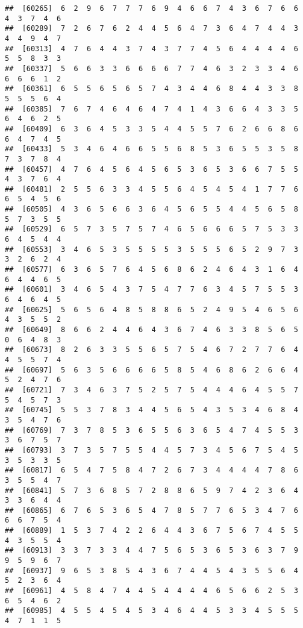 \documentclass[
]{book}
\begin{document}
\begin{verbatim}
##  [60265]  6  2  9  6  7  7  7  6  9  4  6  6  7  4  3  6  7  6  6  4  3  7  4  6
##  [60289]  7  2  6  7  6  2  4  4  5  6  4  7  3  6  4  7  4  4  3  4  4  9  4  7
##  [60313]  4  7  6  4  4  3  7  4  3  7  7  4  5  6  4  4  4  4  6  5  5  8  3  3
##  [60337]  5  6  6  3  3  6  6  6  6  7  7  4  6  3  2  3  3  4  6  6  6  6  1  2
##  [60361]  6  5  5  6  5  6  5  7  4  3  4  4  6  8  4  4  3  3  8  5  5  5  6  4
##  [60385]  7  6  7  4  6  4  6  4  7  4  1  4  3  6  6  4  3  3  5  6  4  6  2  5
##  [60409]  6  3  6  4  5  3  3  5  4  4  5  5  7  6  2  6  6  8  6  6  4  7  4  5
##  [60433]  5  3  4  6  4  6  6  5  5  6  8  5  3  6  5  5  3  5  8  7  3  7  8  4
##  [60457]  4  7  6  4  5  6  4  5  6  5  3  6  5  3  6  6  7  5  5  4  3  7  6  4
##  [60481]  2  5  5  6  3  3  4  5  5  6  4  5  4  5  4  1  7  7  6  6  5  4  5  6
##  [60505]  4  3  6  5  6  6  3  6  4  5  6  5  5  4  4  5  6  5  8  5  7  3  5  5
##  [60529]  6  5  7  3  5  7  5  7  4  6  5  6  6  6  5  7  5  3  3  6  4  5  4  4
##  [60553]  3  4  6  5  3  5  5  5  5  3  5  5  5  6  5  2  9  7  3  3  2  6  2  4
##  [60577]  6  3  6  5  7  6  4  5  6  8  6  2  4  6  4  3  1  6  4  6  4  4  6  5
##  [60601]  3  4  6  5  4  3  7  5  4  7  7  6  3  4  5  7  5  5  3  6  4  6  4  5
##  [60625]  5  6  5  6  4  8  5  8  8  6  5  2  4  9  5  4  6  5  6  4  3  5  5  2
##  [60649]  8  6  6  2  4  4  6  4  3  6  7  4  6  3  3  8  5  6  5  0  6  4  8  3
##  [60673]  8  2  6  3  3  5  5  6  5  7  5  4  6  7  2  7  7  6  4  4  5  5  7  4
##  [60697]  5  6  3  5  6  6  6  6  5  8  5  4  6  8  6  2  6  6  4  5  2  4  7  6
##  [60721]  7  3  4  6  3  7  5  2  5  7  5  4  4  4  6  4  5  5  7  5  4  5  7  3
##  [60745]  5  5  3  7  8  3  4  4  5  6  5  4  3  5  3  4  6  8  4  3  5  4  7  6
##  [60769]  7  3  7  8  5  3  6  5  5  6  3  6  5  4  7  4  5  5  3  3  6  7  5  7
##  [60793]  3  7  3  5  7  5  5  4  4  5  7  3  4  5  6  7  5  4  5  3  5  3  3  5
##  [60817]  6  5  4  7  5  8  4  7  2  6  7  3  4  4  4  4  7  8  6  3  5  5  4  7
##  [60841]  5  7  3  6  8  5  7  2  8  8  6  5  9  7  4  2  3  6  4  3  3  6  4  4
##  [60865]  6  7  6  5  3  6  5  4  7  8  5  7  7  6  5  3  4  7  6  6  6  7  5  4
##  [60889]  1  5  3  7  4  2  2  6  4  4  3  6  7  5  6  7  4  5  5  4  3  5  5  4
##  [60913]  3  3  7  3  3  4  4  7  5  6  5  3  6  5  3  6  3  7  9  9  5  9  6  7
##  [60937]  9  6  5  3  8  5  4  3  6  7  4  4  5  4  3  5  5  6  4  5  2  3  6  4
##  [60961]  4  5  8  4  7  4  4  5  4  4  4  4  6  5  6  6  2  5  3  6  5  4  6  2
##  [60985]  4  5  5  4  5  4  5  3  4  6  4  4  5  3  3  4  5  5  5  4  7  1  1  5

\end{verbatim}
\end{document}
